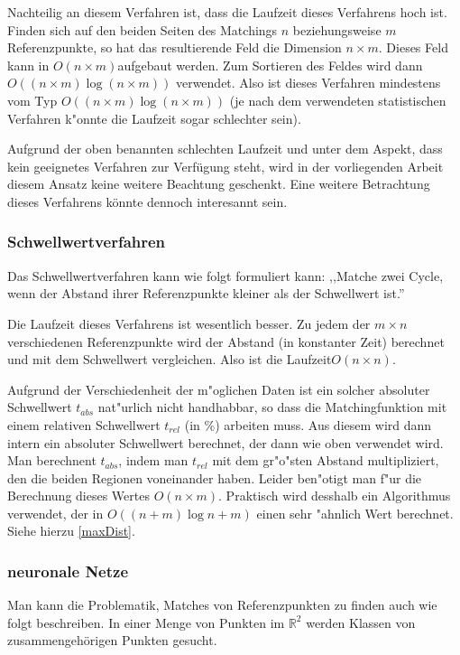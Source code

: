 Nachteilig an diesem Verfahren ist, dass die Laufzeit dieses Verfahrens hoch ist. Finden sich auf den beiden Seiten des Matchings $n$ beziehungsweise $m$ Referenzpunkte, so hat das resultierende Feld die Dimension $n\times m$. Dieses Feld kann in $O(n\times m)$aufgebaut werden. Zum Sortieren des Feldes wird dann $O((n\times m)\log(n\times m))$ verwendet. Also ist dieses Verfahren mindestens vom Typ $O((n\times m)\log(n\times m))$ (je nach dem verwendeten statistischen Verfahren k"onnte die Laufzeit sogar schlechter sein).

Aufgrund der oben benannten schlechten Laufzeit und unter dem Aspekt, dass kein geeignetes Verfahren zur Verfügung steht, wird in der vorliegenden Arbeit diesem Ansatz keine weitere Beachtung geschenkt. Eine weitere Betrachtung dieses Verfahrens könnte dennoch interesannt sein.

\subsubsection*{Schwellwertverfahren}

Das Schwellwertverfahren kann wie folgt formuliert kann: ,,Matche zwei Cycle, wenn der Abstand ihrer Referenzpunkte kleiner als der Schwellwert ist.''

Die Laufzeit dieses Verfahrens ist wesentlich besser. Zu jedem der $m\times n$ verschiedenen  Referenzpunkte wird der  Abstand (in konstanter Zeit) berechnet und mit dem Schwellwert vergleichen. Also ist die Laufzeit$O(n\times n)$.

Aufgrund der Verschiedenheit der m"oglichen Daten ist ein solcher absoluter Schwellwert $t_{abs}$ nat"urlich nicht handhabbar, so dass die Matchingfunktion mit einem relativen Schwellwert $t_{rel}$ (in \%) arbeiten muss. Aus diesem wird dann intern ein absoluter Schwellwert berechnet, der dann wie oben verwendet wird. Man berechnent $t_{abs}$, indem man $t_{rel}$ mit dem gr"o"sten Abstand multipliziert, den die beiden Regionen voneinander haben. Leider ben"otigt man f"ur die Berechnung dieses Wertes $O(n\times m)$. Praktisch wird desshalb ein Algorithmus verwendet, der in $O((n+m)\log{n+m})$ einen sehr "ahnlich Wert berechnet. Siehe hierzu \ref{maxDist}.

\subsubsection*{neuronale Netze}

Man kann die Problematik, Matches von Referenzpunkten zu finden auch wie folgt beschreiben. In einer Menge von Punkten im $\mathbb{R}^2$ werden Klassen von zusammengehörigen Punkten gesucht.

